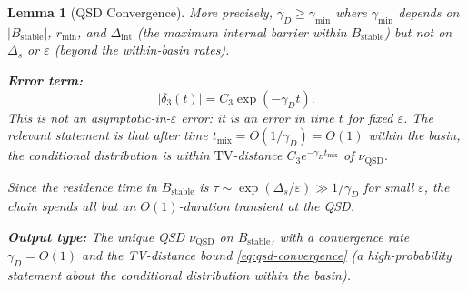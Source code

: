 \documentclass[11pt]{article}
\newtheorem{lemma}{Lemma}
\newcommand{\eps}{\varepsilon}
\newcommand{\Ds}{\Delta_s}
\newcommand{\Bstable}{B_{\mathrm{stable}}}
\newcommand{\TV}{\mathrm{TV}}
\newcommand{\QSD}{\mathrm{QSD}}
\begin{document}
\begin{lemma}[QSD Convergence]
More precisely, $\gamma_D \geq \gamma_{\min}$ where $\gamma_{\min}$
depends on $|\Bstable|$, $r_{\min}$, and $\Delta_{\mathrm{int}}$
(the maximum internal barrier within $\Bstable$) but \emph{not}
on $\Ds$ or $\eps$ (beyond the within-basin rates).

\medskip
\textbf{Error term:}
\[
  |\delta_3(t)| = C_3 \exp(-\gamma_D t).
\]
This is not an asymptotic-in-$\eps$ error: it is an error
in time $t$ for fixed $\eps$. The relevant statement is that
after time $t_{\mathrm{mix}} = O(1/\gamma_D) = O(1)$ within
the basin, the conditional distribution is within $\TV$-distance
$C_3 e^{-\gamma_D t_{\mathrm{mix}}}$ of $\nu_\QSD$.

Since the residence time in $\Bstable$ is
$\tau \sim \exp(\Ds/\eps) \gg 1/\gamma_D$ for small $\eps$,
the chain spends all but an $O(1)$-duration transient at the QSD.

\medskip
\textbf{Output type:}
The unique QSD $\nu_\QSD$ on $\Bstable$, with a convergence rate
$\gamma_D = O(1)$ and the TV-distance bound \eqref{eq:qsd-convergence}
(a high-probability statement about the conditional distribution
within the basin).
\end{lemma}
\end{document}

